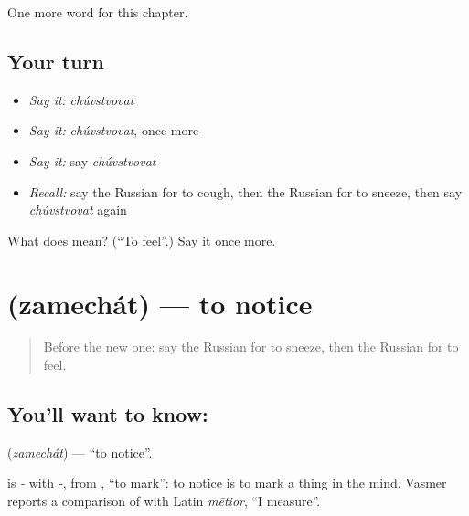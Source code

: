\begin{grammarlens}[title={What you've built}]
One more word for this chapter.
\end{grammarlens}

\subsection*{Your turn}
\begin{itemize}
\raggedright
  \item \emph{Say it:} \emph{chúvstvovat}
  \item \emph{Say it:} \emph{chúvstvovat}, once more
  \item \emph{Say it:} say \emph{chúvstvovat}
  \item \emph{Recall:} say the Russian for to cough, then the Russian for to sneeze, then say \emph{chúvstvovat} again
\end{itemize}

\begin{tcolorbox}[breakable,colback=teal!4,colframe=teal!35!black,title={Before you move on}]
What does  mean? (\textquotedblleft{}To feel\textquotedblright{}.) Say it once more.
\end{tcolorbox}
\section[\texorpdfstring{\ru{замечать} (zamechát)}{замечать (zamechát)}]{ (zamechát) — to notice}

\label{lesson:RU-C208-zamechat}



\begin{quote}
Before the new one: say the Russian for to sneeze, then the Russian for to feel.
\end{quote}

\subsection*{You'll want to know: }
\textbf{} (\emph{zamechát}) — \textquotedblleft{}to notice\textquotedblright{}.

\begin{cousinweb}
\textbf{} is \emph{-} with \emph{-}, from \emph{}, \textquotedblleft{}to mark\textquotedblright{}: to notice is to mark a thing in the mind. Vasmer reports a comparison of \emph{} with Latin \emph{mētior}, \textquotedblleft{}I measure\textquotedblright{}.
\end{cousinweb}

